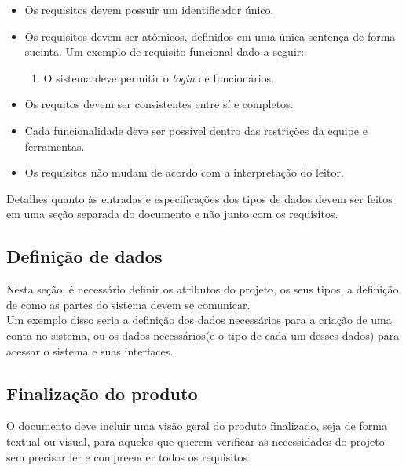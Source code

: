 \documentclass[12pt,a4paper,final]{report}
\begin{document}
\begin{itemize}
\item Os requisitos devem possuir um identificador único.

\item Os requisitos devem ser atômicos,
definidos em uma única sentença de forma sucinta.
Um exemplo de requisito funcional dado a seguir:
\begin{enumerate}
\item O sistema deve permitir o \textit{login} de funcionários.
\end{enumerate}

\item Os requitos devem ser consistentes entre sí e completos.

\item Cada funcionalidade deve ser possível dentro das restrições da equipe e ferramentas.

\item Os requisitos não mudam de acordo com a interpretação do leitor.

\end{itemize}

Detalhes quanto às entradas e especificações dos tipos de dados devem ser feitos em uma seção separada do documento e não junto com os requisitos.\\

\subsection*{Definição de dados}

Nesta seção, é necessário definir os atributos do projeto, os seus tipos, a definição de como as partes do sistema devem se comunicar.\\
Um exemplo disso seria a definição dos dados necessários para a criação de uma conta no sistema, ou os dados necessários(e o tipo de cada um desses dados) para acessar o sistema e suas interfaces.

\subsection*{Finalização do produto}

O documento deve incluir uma visão geral do produto finalizado, seja de forma textual ou visual, para aqueles que querem verificar as necessidades do projeto sem precisar ler e compreender todos os requisitos.\\
\end{document}
